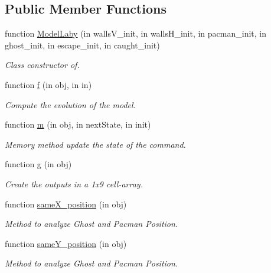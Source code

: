 \subsection*{Public Member Functions}
\begin{DoxyCompactItemize}
\item 
function \hyperlink{class_model_laby_a014d91cfa3ecf1a6fc3ca75ea4f433d4}{Model\+Laby} (in walls\+V\+\_\+init, in walls\+H\+\_\+init, in pacman\+\_\+init, in ghost\+\_\+init, in escape\+\_\+init, in caught\+\_\+init)
\begin{DoxyCompactList}\small\item\em Class constructor of. \end{DoxyCompactList}\item 
function \hyperlink{class_model_laby_a6f3b146c92a207e95690d08975e1e072}{f} (in obj, in in)
\begin{DoxyCompactList}\small\item\em Compute the evolution of the model. \end{DoxyCompactList}\item 
function \hyperlink{class_model_laby_a3140f24c6c4b80037b7d4f521c6ae2d3}{m} (in obj, in next\+State, in init)
\begin{DoxyCompactList}\small\item\em Memory method update the state of the command. \end{DoxyCompactList}\item 
function \hyperlink{class_model_laby_a07dadfabe92bf9a144b8a862720e7746}{g} (in obj)
\begin{DoxyCompactList}\small\item\em Create the outputs in a 1x9 cell-\/array. \end{DoxyCompactList}\item 
function \hyperlink{class_model_laby_ac2632946f3f89dcc57c9f1fd31bbfb53}{same\+X\+\_\+position} (in obj)
\begin{DoxyCompactList}\small\item\em Method to analyze Ghost and Pacman Position. \end{DoxyCompactList}\item 
function \hyperlink{class_model_laby_a104c64766fa031eb4a29214f07da63d2}{same\+Y\+\_\+position} (in obj)
\begin{DoxyCompactList}\small\item\em Method to analyze Ghost and Pacman Position. \end{DoxyCompactList}\item 

\end{DoxyCompactItemize}

